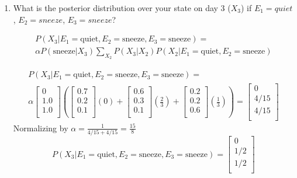 \documentclass[12pt]{article}
\begin{document}
\begin{enumerate}
\item What is the posterior distribution over your state on day 3
  ($X_3$) if $E_1 = quiet$, $E_2 = sneeze$, $E_3 = sneeze$?

  \begin{multline*}
    P(X_3|E_1=\text{quiet},E_2=\text{sneeze},E_3=\text{sneeze}) = \\
    \alpha P(\text{sneeze}|X_3) \sum_{X_2} {P(X_3|X_2) P(X_2|E_1=\text{quiet},E_2=\text{sneeze})}
  \end{multline*}

  \begin{multline*}
    P(X_3|E_1=\text{quiet},E_2=\text{sneeze},E_3=\text{sneeze}) = \\
    \alpha
    \begin{bmatrix}
      0 \\
      1.0 \\
      1.0 \\
    \end{bmatrix}
    (
    \begin{bmatrix}
      0.7 \\
      0.2 \\
      0.1 \\
    \end{bmatrix}
    (0)+
    \begin{bmatrix}
      0.6 \\
      0.3 \\
      0.1 \\
    \end{bmatrix}
    (\frac{2}{3})+
    \begin{bmatrix}
      0.2 \\
      0.2 \\
      0.6 \\
    \end{bmatrix}
    (\frac{1}{3})
    )=
    \begin{bmatrix}
      0 \\
      4/15 \\
      4/15 \\
    \end{bmatrix}
  \end{multline*}
  Normalizing by $\alpha = \frac{1}{4/15+4/15} = \frac{15}{8}$
  \[
    P(X_3|E_1=\text{quiet},E_2=\text{sneeze},E_3=\text{sneeze}) =
    \begin{bmatrix}
      0 \\
      1/2 \\
      1/2 \\
    \end{bmatrix}
  \]


\end{enumerate}
\end{document}
